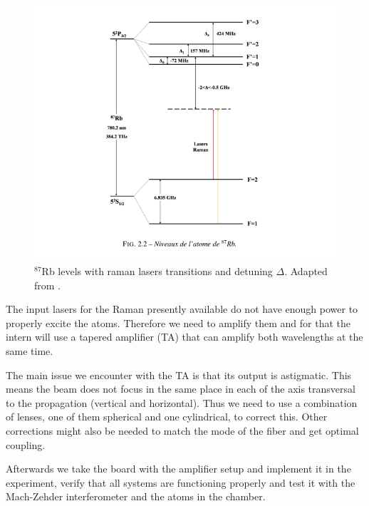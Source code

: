 \documentclass[english, a4paper, 11pt]{article}
\begin{document}
\begin{figure}
    \centering
    \includegraphics[width=1\linewidth]{figures/raman-levels.png}
    \caption{$^{87}$Rb levels with raman lasers transitions and detuning $\Delta$. Adapted from \cite{cheinet2006conception}.}
    \label{fig:levels}
\end{figure}

The input lasers for the Raman presently available do not have enough power to properly excite the atoms. Therefore we need to amplify them and for that the intern will use a tapered amplifier (TA) that can amplify both wavelengths at the same time. 

The main issue we encounter with the TA is that its output is astigmatic. This means the beam does not focus in the same place in each of the axis transversal to the propagation (vertical and horizontal). Thus we need to use a combination of lenses, one of them spherical and one  cylindrical, to correct this. Other corrections might also be needed to match the mode of the fiber and get optimal coupling.

Afterwards we take the board with the amplifier setup and implement it in the experiment, verify that all systems are functioning properly and test it with the Mach-Zehder interferometer and the atoms in the chamber.

\end{document}
